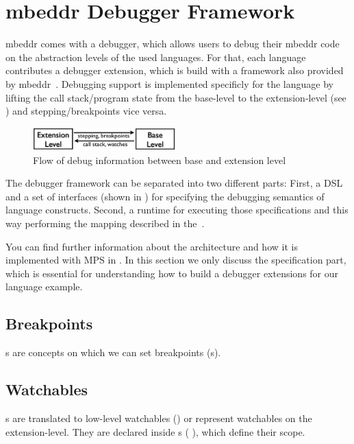 \section{mbeddr Debugger Framework}
\label{mbeddrDebugger}
\label{mbeddrDebuggerFramework}

mbeddr comes with a debugger, which allows users to debug their mbeddr code 
on the abstraction levels of the used languages. For that, each language
contributes a debugger extension, which is build with a framework also provided
by mbeddr~\cite{DBLP:conf/adaEurope/AdaEuropeDeb}.
Debugging support is implemented specificly for the language by
lifting the call stack/program state from the base-level to the
extension-level (see ) and stepping/breakpoints
vice versa.

\begin{figure}[h]
  \vspace{-2mm}
  \centering
    \includegraphics[width=5.5cm]{./figures/two-levels.png} 
    \vspace{-2mm}
    \caption{Flow of debug information between base and
    extension level~\cite{DBLP:conf/adaEurope/AdaEuropeDeb}}
  \label{infoFlow}
  \vspace{-2mm}
\end{figure}



The debugger framework can be separated into two different parts: First, a
\ac{DSL} and a set of interfaces (shown in ) for specifying the
debugging semantics of language constructs. 
Second, a runtime for executing those specifications and
this way performing the mapping described in the~. 

You can find further information about the architecture and how it is
implemented with \ac{MPS} in \cite{DBLP:conf/adaEurope/AdaEuropeDeb}. In this
section we only discuss the specification part, which is essential for
understanding how to build a debugger extensions for our language example.

\subsection{Breakpoints}
s are concepts on which
we can set breakpoints (\eg {}s).

\subsection{Watchables}
s are
translated to low-level watchables (\eg {}) or
represent watchables on the extension-level.
They are declared inside s (\eg
{}), which define their scope.

